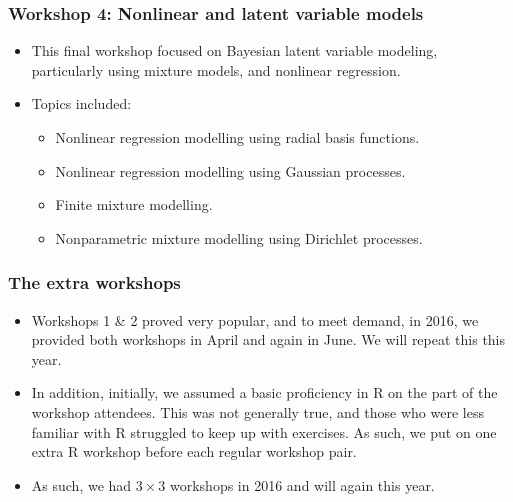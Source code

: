 \begin{frame}
	\frametitle{Workshop 4: Nonlinear and latent variable models}

	\begin{itemize}
		\item This final workshop focused on Bayesian latent variable modeling, particularly using mixture models, and nonlinear regression.
		\item Topics included:
			\begin{itemize}
				\item Nonlinear regression modelling using radial basis functions. 
				\item Nonlinear regression modelling using Gaussian processes.
				\item Finite mixture modelling.
				\item Nonparametric mixture modelling using Dirichlet processes. 
			\end{itemize}


	\end{itemize}

\end{frame}

\begin{frame}
	\frametitle{The extra workshops}

	\begin{itemize}
		\item Workshops 1 \& 2 proved very popular, and to meet demand, in 2016, we provided both workshops in April and again in June. We will repeat this this year.
		\item In addition, initially, we assumed a basic proficiency in R on the part of the workshop attendees. This was not generally true, and those who were less familiar with R struggled to keep up with exercises. As such, we put on one extra R workshop before each regular workshop pair.
		\item As such, we had $3 \times 3$ workshops in 2016 and will again this year.
	\end{itemize}

\end{frame}
